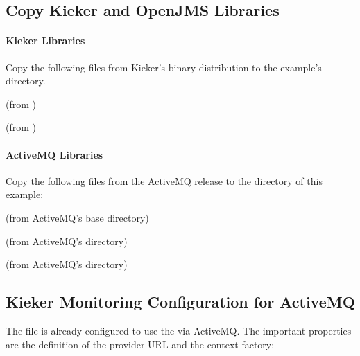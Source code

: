 \subsection{Copy Kieker and OpenJMS Libraries}

\paragraph*{Kieker Libraries}

Copy the following files from Kieker's binary distribution to %
the example's  directory.

\begin{compactenum}
 \item \file{\mainJar} (from )
 \item \file{\commonsLoggingJar} (from )
\end{compactenum}

\paragraph*{ActiveMQ Libraries}

Copy the following files from the ActiveMQ release to the %
 directory of this example:

\begin{compactenum}
\item {} (from ActiveMQ's base directory)
\item {} (from ActiveMQ's  directory)
\item {} (from ActiveMQ's  directory)
\end{compactenum}

\subsection{Kieker Monitoring Configuration for ActiveMQ}

The file  %
is already configured to use the  via ActiveMQ. The important properties are %
the definition of the provider URL and the context factory:

\setPropertiesListing


